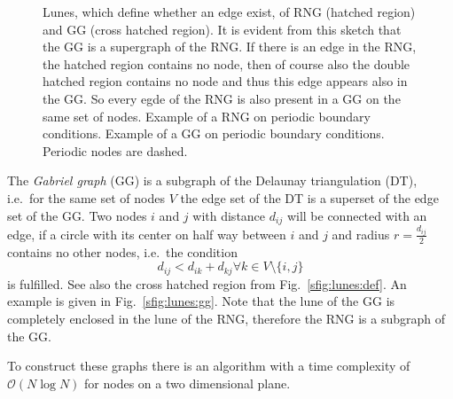     \begin{figure}[htbp]
        \centering
        \caption[Gabriel and Relative Neighborhood Graph]
        {
             Lunes, which define whether an edge
                exist, of RNG (hatched region) and GG (cross hatched region).
                It is evident from this sketch that the GG is a supergraph
                of the RNG. If there is an edge in the RNG, the hatched
                region contains no node, then of course also the double
                hatched region contains no node and thus this edge appears
                also in the GG. So every egde of the RNG is also present
                in a GG on the same set of nodes.
             Example of a RNG on periodic
                boundary conditions.
             Example of a GG on
                periodic boundary conditions. Periodic nodes are dashed.
        }
        \label{fig:lunes}
    \end{figure}

    The \emph{Gabriel graph} (GG) \cite{Gabriel1969} is a subgraph
    of the Delaunay triangulation \cite{Delaunay1934,Katajainen}
    (DT), i.e.~for the same set of nodes \(V\) the edge set of the
    DT is a superset of the edge set of the GG. Two nodes \(i\) and
    \(j\) with distance \(d_{ij}\) will be connected with an edge,
    if a circle with its center on half way between \(i\) and \(j\)
    and radius \(r = \frac{d_{ij}}{2}\) contains no other nodes, i.e.~the
    condition
    \[d_{ij} < d_{ik} + d_{kj} \forall k \in V\setminus\{i,j\}\]
    is fulfilled. See
    also the cross hatched region from Fig.~\ref{sfig:lunes:def}. An
    example is given in Fig.~\ref {sfig:lunes:gg}. Note that the
    lune of the GG is completely enclosed in the lune of the RNG,
    therefore the RNG is a subgraph of the GG.

    To construct these graphs there is an algorithm\cite{RNGCell} with
    a time complexity of \(\mathcal{O}(N \log N)\) for nodes on a two
    dimensional plane.
